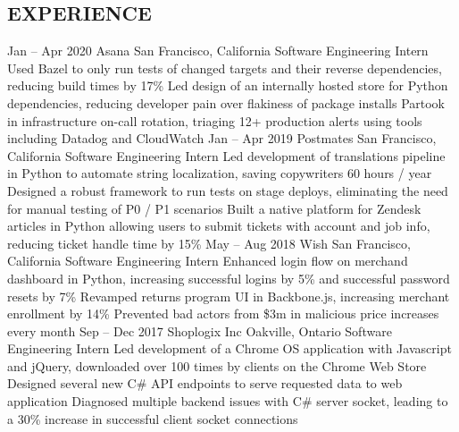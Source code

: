 \documentclass{aanguyen_res}
\begin{document}
  \begin{main}
    \vspace{0.2cm}%
    \section{EXPERIENCE}
      \begin{entrylist}
        \rightentry%
          {Jan -- Apr 2020}%
          {Asana}%
          {San Francisco, California}%
          {Software Engineering Intern}%
          {\createlist%
            {%
              Used Bazel to only run tests of changed targets and their reverse dependencies, %
              reducing build times by 17\% %
            }%
            {%
              Led design of an internally hosted store for Python dependencies, reducing developer %
              pain over flakiness of package installs %
            }%
            {%
              Partook in infrastructure on-call rotation, triaging 12+ production alerts using tools %
              including Datadog and CloudWatch %
            }%
          }
        \rightentry%
          {Jan -- Apr 2019}%
          {Postmates}%
          {San Francisco, California}%
          {Software Engineering Intern}%
          {\createlist%
            {%
              Led development of translations pipeline in Python to automate string localization, %
              saving copywriters 60 hours / year %
            }%
            {%
              Designed a robust framework to run tests on stage deploys, eliminating the need for %
              manual testing of P0 / P1 scenarios %
            }%
            {%
              Built a native platform for Zendesk articles in Python allowing users to submit tickets %
              with account and job info, reducing ticket handle time by 15\% %
            }%
          }
        \rightentry%
          {May -- Aug 2018}%
          {Wish}%
          {San Francisco, California}%
          {Software Engineering Intern}%
          {\createlist%
            {%
              Enhanced login flow on merchand dashboard in Python, increasing successful logins %
              by 5\% and successful password resets by 7\% %
            }%
            {%
              Revamped returns program UI in Backbone.js, increasing merchant enrollment %
              by 14\% %
            }%
            {%
              Prevented bad actors from \$3m in malicious price increases every month %
            }%
          }
        \rightentry%
          {Sep -- Dec 2017}%
          {Shoplogix Inc}%
          {Oakville, Ontario}%
          {Software Engineering Intern}%
          {\createlist%
            {%
              Led development of a Chrome OS application with Javascript and jQuery, downloaded %
              over 100 times by clients on the Chrome Web Store %
            }%
            {%
              Designed several new C\# API endpoints to serve requested data to web application %
            }%
            {%
              Diagnosed multiple backend issues with C\# server socket, leading to a 30\% increase %
              in successful client socket connections %
            }%
          }
      \end{entrylist}

\end{main}
\end{document}
